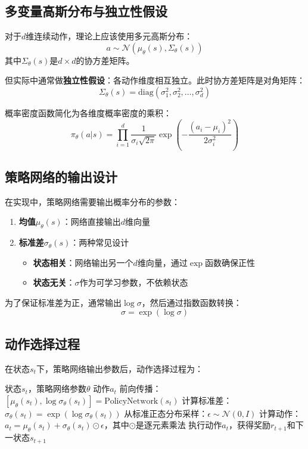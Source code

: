 \subsection{多变量高斯分布与独立性假设}

对于$d$维连续动作，理论上应该使用多元高斯分布：
\[
a \sim \mathcal{N}(\mu_\theta(s), \Sigma_\theta(s))
\]
其中$\Sigma_\theta(s)$是$d \times d$的协方差矩阵。

但实际中通常做\textbf{独立性假设}：各动作维度相互独立。此时协方差矩阵是对角矩阵：
\[
\Sigma_\theta(s) = \text{diag}(\sigma_1^2, \sigma_2^2, \dots, \sigma_d^2)
\]

概率密度函数简化为各维度概率密度的乘积：
\[
\pi_\theta(a|s) = \prod_{i=1}^{d} \frac{1}{\sigma_i\sqrt{2\pi}} \exp\left(-\frac{(a_i - \mu_i)^2}{2\sigma_i^2}\right)
\]

\subsection{策略网络的输出设计}

在实现中，策略网络需要输出概率分布的参数：

\begin{enumerate}
    \item \textbf{均值$\mu_\theta(s)$}：网络直接输出$d$维向量
    \item \textbf{标准差$\sigma_\theta(s)$}：两种常见设计
    \begin{itemize}
        \item \textbf{状态相关}：网络输出另一个$d$维向量，通过$\exp$函数确保正性
        \item \textbf{状态无关}：$\sigma$作为可学习参数，不依赖状态
    \end{itemize}
\end{enumerate}

为了保证标准差为正，通常输出$\log\sigma$，然后通过指数函数转换：
\[
\sigma = \exp(\log\sigma)
\]

\subsection{动作选择过程}

在状态$s_t$下，策略网络输出参数后，动作选择过程为：

\begin{algorithm}[H]
\caption{随机策略的动作选择}
\begin{algorithmic}[1]
\REQUIRE 状态$s_t$，策略网络参数$\theta$
\ENSURE 动作$a_t$
\STATE 前向传播：$[\mu_\theta(s_t), \log\sigma_\theta(s_t)] = \text{PolicyNetwork}(s_t)$
\STATE 计算标准差：$\sigma_\theta(s_t) = \exp(\log\sigma_\theta(s_t))$
\STATE 从标准正态分布采样：$\epsilon \sim \mathcal{N}(0, I)$
\STATE 计算动作：$a_t = \mu_\theta(s_t) + \sigma_\theta(s_t) \odot \epsilon$，其中$\odot$是逐元素乘法
\STATE 执行动作$a_t$，获得奖励$r_{t+1}$和下一状态$s_{t+1}$
\end{algorithmic}
\end{algorithm}

